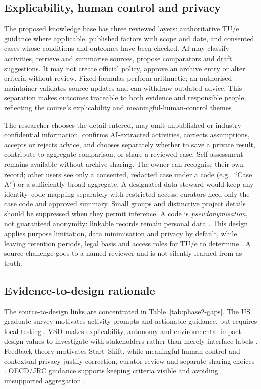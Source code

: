 \subsection{Explicability, human control and privacy}
The proposed knowledge base has three reviewed layers: authoritative TU/e guidance where applicable, published factors with scope and date, and consented cases whose conditions and outcomes have been checked. AI may classify activities, retrieve and summarise sources, propose comparators and draft suggestions. It may not create official policy, approve an archive entry or alter criteria without review. Fixed formulas perform arithmetic; an authorised maintainer validates source updates and can withdraw outdated advice. This separation makes outcomes traceable to both evidence and responsible people, reflecting the course's explicability and meaningful-human-control themes \citep{friedman2019shaping,santoni2018control,eu_ethics_2021}.

The researcher chooses the detail entered, may omit unpublished or industry-confidential information, confirms AI-extracted activities, corrects assumptions, accepts or rejects advice, and chooses separately whether to save a private result, contribute to aggregate comparison, or share a reviewed case. Self-assessment remains available without archive sharing. The owner can recognise their own record; other users see only a consented, redacted case under a code (e.g., ``Case A'') or a sufficiently broad aggregate. A designated data steward would keep any identity--code mapping separately with restricted access; curators need only the case code and approved summary. Small groups and distinctive project details should be suppressed when they permit inference. A code is \emph{pseudonymisation}, not guaranteed anonymity: linkable records remain personal data \citep{edpb2025pseudonymisation,gdpr2016}. This design applies purpose limitation, data minimisation and privacy by default, while leaving retention periods, legal basis and access roles for TU/e to determine \citep{gdpr2016,nissenbaum2004privacy}. A source challenge goes to a named reviewer and is not silently learned from as truth.

\subsection{Evidence-to-design rationale}
The source-to-design links are concentrated in Table~\ref{tab:phase2-gaps}. The US graduate survey motivates activity prompts and actionable guidance, but requires local testing \citep{shiekh2026graduate}. VSD makes explicability, autonomy and environmental impact design values to investigate with stakeholders rather than merely interface labels \citep{friedman2019shaping}. Feedback theory motivates Start--Shift, while meaningful human control and contextual privacy justify correction, curator review and separate sharing choices \citep{carver1982control,hattie2007feedback,santoni2018control,nissenbaum2004privacy}. OECD/JRC guidance supports keeping criteria visible and avoiding unsupported aggregation \citep{oecd2008composite}.

